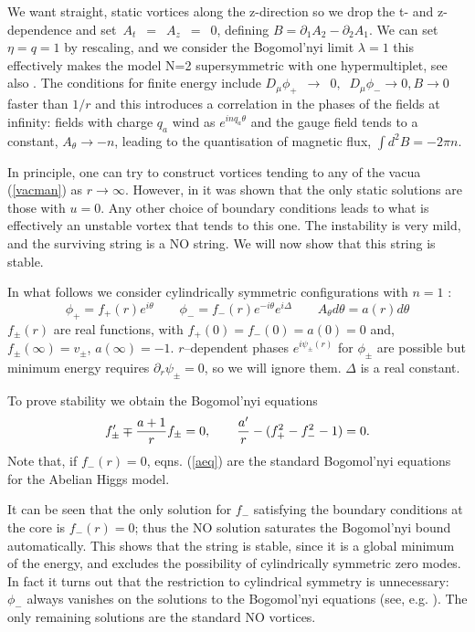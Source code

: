 \documentclass[a4paper,aps,prd,superscriptaddress,floats]{revtex4}
\begin{document}
We want straight, static vortices along the z-direction so we drop the
t- and z-dependence and set~$A_t$~$=$~$A_z$~$=$~$0$, defining
$B=\partial_1A_2-\partial_2A_1$. We can set $\eta=q=1$ by rescaling,
and we consider the Bogomol'nyi limit $\lambda=1$ {this effectively
makes the model N=2 supersymmetric with one hypermultiplet, see also
\cite{edel,FG98,hou}}.  The conditions for finite energy include
$D_\mu \phi_+$~$\to$~$0,$ $\ D_\mu \phi_- \to 0 , B \to 0 $ faster
than $1/r$ and this introduces a correlation in the phases of the
fields at infinity: fields with charge $q_a$ wind as $e^{inq_a
\theta}$ and the gauge field tends to a constant, $A_\theta \to -n$,
leading to the quantisation of magnetic flux, $\int d^2 B = -2\pi n$.

In principle, one can try to construct vortices tending to any of the
vacua (\ref{vacman}) as $r \to \infty$.  However, in \cite{PRTT96} it
was shown that the only static solutions are those with $u=0$.  Any
other choice of boundary conditions leads to what is effectively an
unstable vortex that tends to this one. The instability is very mild,
and the surviving string is a NO string. We will now show that this
string is stable.

In what follows we consider cylindrically symmetric configurations
with $n=1$ :
\[
\phi_+ = f_+(r) e^{i\theta} \qquad
\phi_- = f_-(r) e^{-i\theta}e^{i\Delta} \qquad
A_\theta  d\theta= a(r) d\theta 
\]
$f_\pm(r)$ are real functions, with  
$f_+(0) = f_-(0)=a(0)=0$ and, 
$f_\pm(\infty)=v_\pm$, $a(\infty)=-1$.
 $r$--dependent phases $e^{i\psi_\pm(r)}$
for $\phi_\pm$ are possible but 
minimum energy requires 
$\partial_r \psi_\pm = 0$, so we will ignore them. 
$\Delta$ is a real constant.

To prove stability we obtain the Bogomol'nyi equations
\begin{equation}
f'_\pm \mp \frac{a+1}r f_\pm = 0, \qquad {a'\over r} - (f_+^2 - f_-^2 -1) = 0. \label{aeq} 
\end{equation}
Note that, if $f_-(r)=0$, eqns. (\ref{aeq}) are 
the standard Bogomol'nyi  equations for the Abelian Higgs model.

It can be seen that the only solution for $f_-$ satisfying the boundary
conditions at the core is $f_-(r)=0$; thus the NO solution saturates
the Bogomol'nyi bound automatically. This shows that the string is
stable, since it is a  global minimum of the energy, and excludes the
possibility of cylindrically symmetric zero modes. In fact it turns
out that the restriction  to cylindrical symmetry is unnecessary:
$\phi_-$ always vanishes on the solutions to the Bogomol'nyi equations
(see, e.g. \cite{W.}).  The only remaining solutions are the standard
NO vortices.
\end{document}
